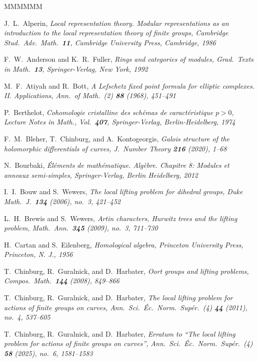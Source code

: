 \documentclass[11pt]{amsart}
\begin{document}

\begin{thebibliography}{MMMMMM}

 J.\ L.\ Alperin,
\sl Local representation theory. Modular representations as an introduction to the local representation theory of finite groups,
\rm Cambridge Stud.\ Adv.\ Math.\ {\bf 11}, Cambridge University Press, Cambridge, 1986

 F.\ W.\ Anderson and K.\ R.\ Fuller,
\sl Rings and categories of modules,
\rm Grad.\ Texts in Math.\ {\bf 13}, Springer-Verlag, New York, 1992

 M.\ F.\ Atiyah and R.\ Bott,
\sl A Lefschetz fixed point formula for elliptic complexes. II. Applications,
\rm Ann.\ of Math.\ (2) {\bf 88} (1968), 451--491
 
 P.\ Berthelot,
\sl Cohomologie cristalline des sch\'emas de caract\'eristique $p>0$,
\rm Lecture Notes in Math., Vol.\ {\bf 407}, Springer-Verlag, Berlin-Heidelberg, 1974

 F.\ M.\ Bleher, T.\ Chinburg, and A.\ Kontogeorgis,
\sl Galois structure of the holomorphic differentials of curves,
\rm J.\ Number Theory {\bf 216} (2020), 1--68

 N.\ Bourbaki,
\sl \'{E}l\'{e}ments de math\'{e}matique. Alg\`{e}bre. Chapitre 8: Modules et anneaux semi-simples,
\rm Springer-Verlag, Berlin Heidelberg, 2012

 I.\ I.\ Bouw and S.\ Wewers,
\sl The local lifting problem for dihedral groups,
\rm Duke Math.\ J.\ {\bf 134} (2006), no.\ 3, 421--452

 L.\ H.\ Brewis and S.\ Wewers,
\sl Artin characters, Hurwitz trees and the lifting problem,
\rm Math.\ Ann.\ {\bf 345} (2009), no.\ 3, 711--730

 H.\ Cartan and S.\ Eilenberg, 
\sl Homological algebra,
\rm Princeton University Press, Princeton, N. J., 1956

 T.\ Chinburg, R.\ Guralnick, and D.\ Harbater,
\sl Oort groups and lifting problems,
\rm Compos.\ Math.\ {\bf 144} (2008), 849--866

 T.\ Chinburg, R.\ Guralnick, and D.\ Harbater,
\sl The local lifting problem for actions of finite groups on curves,
\rm Ann.\ Sci.\ Éc.\ Norm.\ Supér.\ (4) {\bf 44} (2011), no.\ 4, 537--605

 T.\ Chinburg, R.\ Guralnick, and D.\ Harbater,
\sl Erratum to ``The local lifting problem for actions of finite groups on curves'',
\rm Ann.\ Sci.\ Éc.\ Norm.\ Supér.\ (4) {\bf 58} (2025), no.\ 6, 1581--1583


\end{thebibliography}
\end{document}
